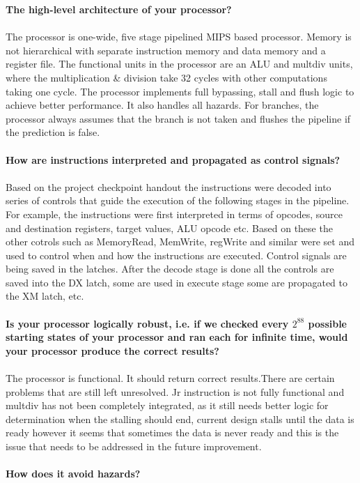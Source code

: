 \textbf{The high-level architecture of your processor?}\\
\\
 The processor is one-wide, five stage pipelined MIPS based processor. Memory is not hierarchical with separate instruction memory and data memory and a register file. The functional units in the processor are an ALU and multdiv units, where the multiplication \& division take 32 cycles with other computations taking one cycle. The processor implements full bypassing, stall and flush logic to achieve better performance. It also handles all hazards. For branches, the processor always assumes that the branch is not taken and flushes the pipeline if the prediction is false. \\
 \\
\textbf{How are instructions interpreted and propagated as control signals?}\\
\\
Based on the project checkpoint handout the instructions were decoded into series of controls that guide the execution of the following stages in the pipeline. For example, the instructions were first interpreted in terms of opcodes, source and destination registers, target values, ALU opcode etc. Based on these the other cotrols such as MemoryRead, MemWrite, regWrite and similar were set and used to control when and how the instructions are executed. Control signals are being saved in the latches. After the decode stage is done all the controls are saved into the DX latch, some are used in execute stage some are propagated to the XM latch, etc. \\
\\
\textbf{ Is your processor logically robust, i.e. if we checked every $2^88$ possible starting states of your processor and ran each for infinite time, would your processor produce the
correct results?}\\
\\
The processor is functional. It should return correct results.There are certain problems that are still left unresolved. Jr instruction is not fully functional and multdiv has not been completely integrated, as it still needs better logic for determination when the stalling should end, current design stalls until the data is ready however it seems that sometimes the data is never ready and this is the issue that needs to be addressed in the future improvement.\\
\\
\textbf{ How does it avoid hazards?}\\
